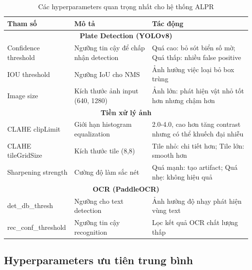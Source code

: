 \begin{table}[!ht]
\centering
\caption{Các hyperparameters quan trọng nhất cho hệ thống ALPR}
\label{tab:alpr_hyperparams_high}
\begin{tabular}{|l|p{5cm}|p{5cm}|}
\hline
\textbf{Tham số} & \textbf{Mô tả} & \textbf{Tác động} \\ \hline
\multicolumn{3}{|c|}{\textbf{Plate Detection (YOLOv8)}} \\ \hline
Confidence threshold & Ngưỡng tin cậy để chấp nhận detection & Quá cao: bỏ sót biển số mờ; Quá thấp: nhiều false positive \\ \hline
IOU threshold & Ngưỡng IoU cho NMS & Ảnh hưởng việc loại bỏ box trùng \\ \hline
Image size & Kích thước ảnh input (640, 1280) & Ảnh lớn: phát hiện vật nhỏ tốt hơn nhưng chậm hơn \\ \hline
\multicolumn{3}{|c|}{\textbf{Tiền xử lý ảnh}} \\ \hline
CLAHE clipLimit & Giới hạn histogram equalization & 2.0-4.0, cao hơn tăng contrast nhưng có thể khuếch đại nhiễu \\ \hline
CLAHE tileGridSize & Kích thước tile (8,8) & Tile nhỏ: chi tiết hơn; Tile lớn: smooth hơn \\ \hline
Sharpening strength & Cường độ làm sắc nét & Quá mạnh: tạo artifact; Quá nhẹ: không hiệu quả \\ \hline
\multicolumn{3}{|c|}{\textbf{OCR (PaddleOCR)}} \\ \hline
det\_db\_thresh & Ngưỡng cho text detection & Ảnh hưởng độ nhạy phát hiện vùng text \\ \hline
rec\_conf\_threshold & Ngưỡng tin cậy recognition & Lọc kết quả OCR chất lượng thấp \\ \hline
\end{tabular}
\end{table}

\subsection{Hyperparameters ưu tiên trung bình}

